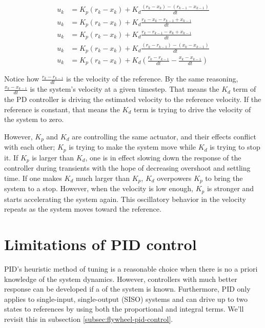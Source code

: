 \begin{align*}
  u_k &= K_p (r_k - x_k) + K_d \frac{(r_k - x_k) - (r_{k-1} - x_{k-1})}{dt} \\
  u_k &= K_p (r_k - x_k) + K_d \frac{r_k - x_k - r_{k-1} + x_{k-1}}{dt} \\
  u_k &= K_p (r_k - x_k) + K_d \frac{r_k - r_{k-1} - x_k + x_{k-1}}{dt} \\
  u_k &= K_p (r_k - x_k) + K_d \frac{(r_k - r_{k-1}) - (x_k - x_{k-1})}{dt} \\
  u_k &= K_p (r_k - x_k) + K_d \left(\frac{r_k - r_{k-1}}{dt} -
    \frac{x_k - x_{k-1}}{dt}\right)
\end{align*}

Notice how $\frac{r_k - r_{k-1}}{dt}$ is the velocity of the reference. By the
same reasoning, $\frac{x_k - x_{k-1}}{dt}$ is the system's velocity at a given
timestep. That means the $K_d$ term of the PD controller is driving the
estimated velocity to the reference velocity. If the reference is constant, that
means the $K_d$ term is trying to drive the velocity of the system to zero.

However, $K_p$ and $K_d$ are controlling the same actuator, and their effects
conflict with each other; $K_p$ is trying to make the system move while $K_d$ is
trying to stop it. If $K_p$ is larger than $K_d$, one is in effect slowing down
the response of the controller during transients with the hope of decreasing
overshoot and settling time. If one makes $K_d$ much larger than $K_p$, $K_d$
overpowers $K_p$ to bring the system to a stop. However, when the velocity is
low enough, $K_p$ is stronger and starts accelerating the system again. This
oscillatory behavior in the velocity repeats as the system moves toward the
reference.

\section{Limitations of PID control}

PID's heuristic method of tuning is a reasonable choice when there is no a
priori knowledge of the \gls{system} dynamics. However, controllers with much
better response can be developed if a  of the
\gls{system} is known. Furthermore, PID only applies to single-input,
single-output (SISO) systems and can drive up to two \glspl{state} to
\glspl{reference} by using both the proportional and integral terms. We'll
revisit this in subsection \ref{subsec:flywheel-pid-control}.
